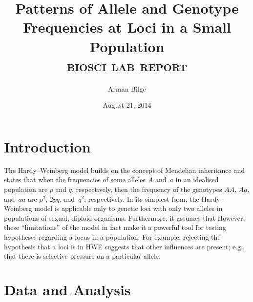 \documentclass{article}
\title{Patterns of Allele and Genotype Frequencies at Loci in a Small
           Population \\
       \Large\textsc{biosci \oldstylenums{210} lab report}}
\author{Arman Bilge}
\date{August 21, 2014}
\begin{document}
    \maketitle

    \section*{Introduction}

        The Hardy--Weinberg model builds on the concept of Mendelian
            inheritance and states that when the frequencies of some alleles
            $A$ and~$a$ in an idealised population are $p$ and $q$,
            respectively, then the frequency of the genotypes $AA$, $Aa$,
            and~$aa$ are $p^2$, $2pq$, and~$q^2$, respectively.
        In its simplest form, the Hardy--Weinberg model is applicable only to
            genetic loci with only two alleles in populations of sexual,
            diploid organisms.
        Furthermore, it assumes that
        However, these \enquote{limitations} of the model in fact make it a
            powerful tool for testing hypotheses regarding a locus in a
            population.
        For example, rejecting the hypothesis that a loci is in \ac{HWE}
            suggests that other influences are present; e.g., that there is
            selective pressure on a particular allele.

    \section*{Data and Analysis}
\end{document}

